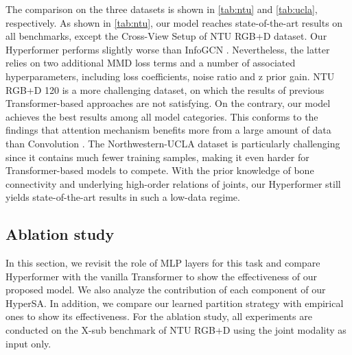 \documentclass[10pt,twocolumn,letterpaper]{article}
\begin{document}

The comparison on the three datasets is shown in \cref{tab:ntu} and \cref{tab:ucla}, respectively. As shown in \cref{tab:ntu}, our model reaches state-of-the-art results on all benchmarks, except the Cross-View Setup of NTU RGB+D dataset. Our Hyperformer performs slightly worse than InfoGCN \cite{chi2022infogcn}. Nevertheless, the latter relies on two additional MMD loss terms and a number of associated hyperparameters, including loss coefficients, noise ratio and z prior gain. NTU RGB+D 120 is a more challenging dataset, on which the results of previous Transformer-based approaches are not satisfying. On the contrary, our model achieves the best results among all model categories. This conforms to the findings that attention mechanism benefits more from a large amount of data than Convolution \cite{dosovitskiy2021an, touvron2021training}. The Northwestern-UCLA dataset is particularly challenging since it contains much fewer training samples, making it even harder for Transformer-based models to compete. With the prior knowledge of bone connectivity and underlying high-order relations of joints, our Hyperformer still yields state-of-the-art results in such a low-data regime.









\subsection{Ablation study}
In this section, we revisit the role of MLP layers for this task and compare Hyperformer with the vanilla Transformer to show the effectiveness of our proposed model. We also analyze the contribution of each component of our HyperSA. In addition,
we compare our learned partition strategy with empirical ones to show its effectiveness.
For the ablation study, all experiments
are conducted on the
X-sub benchmark of NTU RGB+D using the joint modality as input only.
\end{document}
